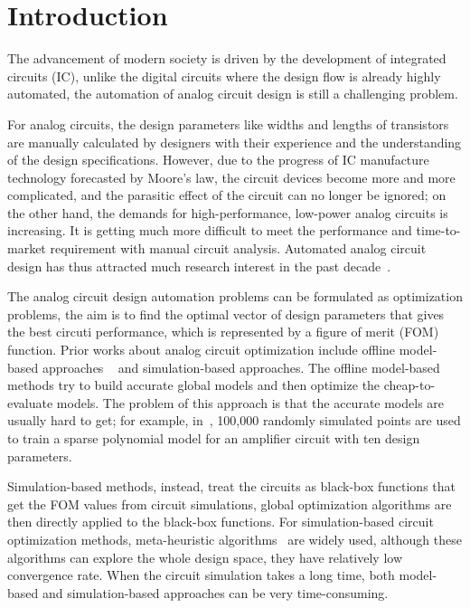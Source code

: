 \section{Introduction}

%
The advancement of modern society is driven by the development of integrated
circuits (IC), unlike the digital circuits where the design flow is already
highly automated, the automation of analog circuit design is still a
challenging problem. 

For analog circuits, the design parameters like widths and lengths of
transistors are manually calculated by designers with their experience and the
understanding of the design specifications. However, due to the progress of IC
manufacture technology forecasted by Moore's law, the circuit devices become
more and more complicated, and the parasitic effect of the circuit can no
longer be ignored; on the other hand, the demands for high-performance,
low-power analog circuits is increasing. It is getting much more difficult to
meet the performance and time-to-market requirement with manual circuit analysis.
Automated analog circuit design has thus attracted much research interest in
the past decade~\cite{rutenbar2007hierarchical}.

The analog circuit design automation problems can be formulated as optimization
problems, the aim is to find the optimal vector of design parameters that gives
the best circuti performance, which is represented by a figure of merit (FOM)
function. Prior works about analog circuit optimization include offline
model-based approaches
~\cite{colleran2003optimization,daems2003simulation,wang2014enabling} and
simulation-based approaches. The offline model-based methods try to build
accurate global models and then optimize the cheap-to-evaluate models. The
problem of this approach is that the accurate models are usually hard to get;
for example, in~\cite{wang2014enabling}, 100,000 randomly simulated points are
used to train a sparse polynomial model for an amplifier circuit with ten
design parameters. 

Simulation-based methods, instead, treat the circuits as black-box functions
that get the FOM values from circuit simulations, global optimization
algorithms are then directly applied to the black-box functions. For
simulation-based circuit optimization methods, meta-heuristic
algorithms~\cite{phelps2000anaconda, liu2009analog} are widely used, although
these algorithms can explore the whole design space, they have relatively low
convergence rate. When the circuit simulation takes a long time, both
model-based and simulation-based approaches can be very time-consuming.

